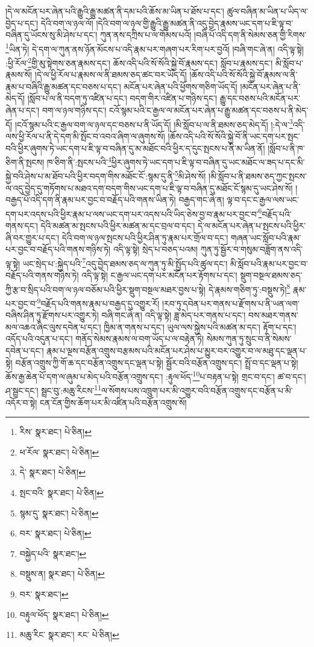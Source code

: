 །དེ་ལ་མངོན་པར་ཞེན་པའི་རྒྱུའི་རྒྱུ་མཚན་ནི་དམ་པའི་ཆོས་མ་ཡིན་པ་ཐོས་པ་དང་། ཚུལ་བཞིན་མ་ཡིན་པ་ཡིད་ལ་བྱེད་པ་དང་། དེའི་བག་ལ་ཉལ་ལོ། །དེའི་བག་ལ་ཉལ་གྱི་རྒྱུའི་རྒྱུ་མཚན་ནི་འདུ་བྱེད་རྣམས་ཡང་དག་པ་ཇི་ལྟ་བ་བཞིན་དུ་ཡོངས་སུ་མི་ཤེས་པ་དང་། ཀུན་ནས་དཀྲིས་པ་ལ་གོམས་པའོ། །བཞི་པོ་འདི་དག་ནི་སེམས་ཅན་གྱི་རིགས་\footnote{རིས་  སྣར་ཐང་།  པེ་ཅིན། }ཡིན་ཏེ། དེ་དག་ལ་ཀུན་ནས་ཉོན་མོངས་པ་འདི་རྣམ་པར་གཞག་པར་རིག་པར་བྱའོ། །བཞི་གང་ཞེ་ན། འདི་ལྟ་སྟེ། :ཕྱི་རོལ་\footnote{ཕ་རོལ་  སྣར་ཐང་།  པེ་ཅིན། }གྱི་མུ་སྟེགས་ཅན་རྣམས་དང་། ཆོས་འདི་པའི་སོ་སོའི་སྐྱེ་བོ་རྣམས་དང་། སློབ་པ་རྣམས་དང་། མི་སློབ་པ་རྣམས་སོ། །དེ་ལ་ཕྱི་རོལ་པ་རྣམས་ལ་ནི་ཐམས་ཅད་ཚང་བར་ཡོད་དོ། །ཆོས་འདི་པའི་སོ་སོའི་སྐྱེ་བོ་རྣམས་ལ་ནི་རྣམ་པ་བཞིའི་རྒྱུ་མཚན་དང་བཅས་པ་དང་། མངོན་པར་ཞེན་པའི་ཕྱོགས་གཅིག་ཡོད་དོ། །མངོན་པར་ཞེན་པ་ནི་མེད་དོ། །སློབ་པ་ལ་ནི་བདག་ཏུ་འཛིན་པ་དང་། བདག་གིར་འཛིན་པ་གཉིས་དང་། རྒྱུ་དང་བཅས་པའི་མངོན་པར་ཞེན་པ་དང་། བག་ལ་ཉལ་གཉིས་དང་། ངའོ་སྙམ་པའི་ང་རྒྱལ་ལ་མངོན་པར་ཞེན་པ་རྒྱུ་མཚན་དང་བཅས་པ་ནི་མེད་དོ། །ངའོ་སྙམ་པའི་ང་རྒྱལ་བག་ལ་ཉལ་དང་བཅས་པ་ནི་ཡོད་དོ། །མི་སློབ་པ་ལ་ནི་ཐམས་ཅད་མེད་དོ། །:དེ་ལ་\footnote{དེ་  སྣར་ཐང་།  པེ་ཅིན། }འདི་ལས་ཕྱི་རོལ་པ་ནི་དེ་དག་མི་སྤོང་བ་འབའ་ཞིག་ལ་ཞུགས་སོ། །ཆོས་འདི་པའི་སོ་སོའི་སྐྱེ་བོ་ནི་ཡང་དག་པར་སྤང་བའི་ཕྱིར་ཞུགས་ཏེ་ཡང་དག་པ་ཇི་ལྟ་བ་བཞིན་དུ་མ་མཐོང་བའི་ཕྱིར་ད་དུང་སྤངས་པ་ནི་མ་ཡིན་ནོ། །སློབ་པ་ནི་ཁ་ཅིག་ནི་སྤངས། ཁ་ཅིག་ནི་:སྤངས་པའི་\footnote{སྤང་བའི་  སྣར་ཐང་།  པེ་ཅིན། }ཕྱིར་ཞུགས་ཏེ་ཡང་དག་པ་ཇི་ལྟ་བ་བཞིན་དུ་ཡང་མཐོང་ལ་ཟད་པ་དང་མི་སྐྱེ་བའི་ཤེས་པ་མ་ཐོབ་པའི་ཕྱིར་བདག་གིས་མཐོང་ངོ་:སྙམ་དུ་ནི་\footnote{སྙམ་དུ་  སྣར་ཐང་།  པེ་ཅིན། }མི་ཤེས་སོ། །མི་སློབ་པ་ནི་ཐམས་ཅད་ཀྱང་སྤངས་ལ་འདུ་བྱེད་དུ་གཏོགས་པ་མཐའ་དག་བདག་གིས་ཡང་དག་པ་ཇི་ལྟ་བ་བཞིན་དུ་མཐོང་ངོ་སྙམ་དུ་ཡང་ཤེས་སོ། །བརྒྱད་པོ་འདི་དག་ནི་རྣམ་པར་བྱང་བ་བརྗོད་པའི་གནས་ཡིན་ཏེ། བརྒྱད་གང་ཞེ་ན། ལྟ་བ་དང་ང་རྒྱལ་ལས་ཡང་དག་པར་འདས་པའི་ཕྱིར་རྣམ་པ་ལས་ཡང་དག་པར་འདས་པའི་ཡིད་ཅེས་བྱ་བ་རྣམ་པར་བྱང་བ་\footnote{བར་  སྣར་ཐང་།  པེ་ཅིན། }བརྗོད་པའི་གནས་དང་། དེའི་མཚན་མ་སྤངས་པའི་ཕྱིར་མཚན་མ་དང་བྲལ་བ་དང་། དེ་ལ་མངོན་པར་ཞེན་པ་སྤངས་པའི་ཕྱིར་ཞི་བར་གྱུར་པ་དང་། དེའི་བག་ལ་ཉལ་སྤངས་པའི་ཕྱིར་ཤིན་ཏུ་རྣམ་པར་གྲོལ་བ་དང་། གཞན་ཡང་སློབ་པའི་རྣམ་པར་བྱང་བ་བརྗོད་པའི་གནས་གཉིས་ཏེ། འདི་ལྟ་སྟེ། སྲེད་པ་བཅད་པའམ། ཀུན་ཏུ་སྦྱོར་བ་གསུམ་བཟློག་ནས་འདི་ལྟ་སྟེ། ཡང་སྲེད་པ་:སྐྱེད་པའི་\footnote{བསྐྱེད་པའི་  སྣར་ཐང་། }འདུ་བྱེད་ཐམས་ཅད་ལ་ཀུན་ཏུ་མི་སྤྱོད་པའི་ཚུལ་དང་། མི་སློབ་པའི་རྣམ་པར་བྱང་བ་བརྗོད་པའི་གནས་གཉིས་ཏེ། འདི་ལྟ་སྟེ། ང་རྒྱལ་ཡང་དག་པར་མངོན་པར་རྟོགས་པ་དང་། སྡུག་བསྔལ་ཐམས་ཅད་ཀྱི་རྩ་བ་སྲིད་པའི་བག་ལ་ཉལ་བཅོམ་པའི་ཕྱིར་སྡུག་བསྔལ་མཐར་བྱས་པ་སྟེ། དེ་རྣམས་གཅིག་ཏུ་:བསྡུས་ཏེ།\footnote{བསྡུས་ན།  སྣར་ཐང་།  པེ་ཅིན། } རྣམ་པར་བྱང་བ་\footnote{བར་  སྣར་ཐང་། }བརྗོད་པའི་གནས་རྣམ་པ་བརྒྱད་དུ་འགྱུར་རོ། །རབ་ཏུ་དབེན་པར་གནས་པ་རྫོགས་པ་ནི་ཡན་ལག་བཞིས་ཤིན་ཏུ་རྫོགས་པར་འགྱུར་ཏེ། བཞི་གང་ཞེ་ན། འདི་ལྟ་སྟེ། ཟླ་མེད་པར་གནས་པ་དང་། བས་མཐར་གནས་མལ་འཆའ་ཞིང་ལུས་དབེན་པ་དང་། ཁྱིམ་ན་གནས་པ་དང་། ཡུལ་ལས་སྐྱེས་པའི་མཚན་མ་དང་། རྟོག་པ་དང་། འདོད་པའི་འདུན་པ་དང་། གནོད་སེམས་རྣམས་ལ་བག་ཡོད་པ་ལ་བརྟེན་ཏེ། སེམས་ཀུན་ཏུ་སྲུང་བ་ནི་སེམས་དབེན་པ་དང་། རྣམ་པ་ལྔས་བརྩོན་འགྲུས་བརྩམས་པའི་མངོན་པར་ཤེས་པ་མྱུར་བར་འགྱུར་བ་ལ་མཐུ་དང་ལྡན་པ་སྟེ། བརྩོན་འགྲུས་ཀྱི་གོ་ཆ་དང་བརྩོན་འགྲུས་དང་ལྡན་པ་སྟེ། སྦྱོར་བའི་བརྩོན་འགྲུས་དང་། སྤྲོ་བ་དང་ལྡན་པ་སྟེ། ཆོས་རྒྱ་ཆེན་པོ་དག་ལ་ཞུམ་པ་མེད་པའི་བརྩོན་འགྲུས་དང་། :རྟུལ་ཕོད་\footnote{བརྟུལ་ཕོད་  སྣར་ཐང་།  པེ་ཅིན། }པ་བརྟན་པ་སྟེ། གྲང་བ་དང་། ཚ་བ་དང་། ཤ་སྦྲང་དང་། སྦྲང་བུ་:མཆུ་རིངས་\footnote{མཆུ་རིང་  སྣར་ཐང་། རང་  པེ་ཅིན། }ལ་སོགས་པས་འཁྲུག་པར་མི་འགྱུར་བའི་བརྩོན་འགྲུས་དང་བརྩོན་པ་མི་འདོར་བ་སྟེ། ངན་ངོན་གྱིས་ཆོག་པར་མི་འཛིན་པའི་བརྩོན་འགྲུས་སོ། 